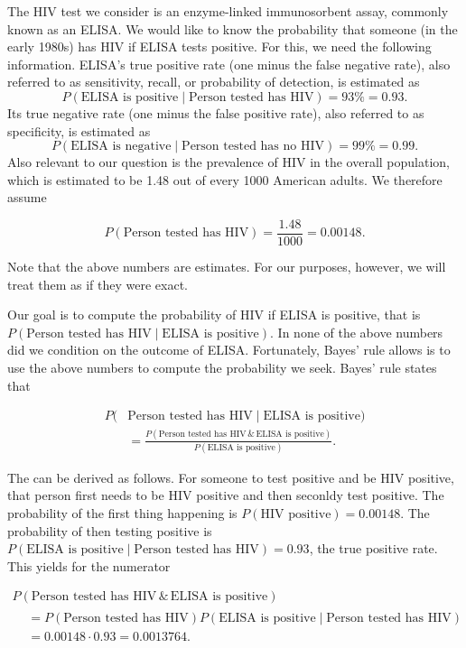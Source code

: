 \documentclass[]{book}
\theoremstyle{definition}
\theoremstyle{definition}
\theoremstyle{definition}
\theoremstyle{remark}
\begin{document}
The HIV test we consider is an enzyme-linked immunosorbent assay,
commonly known as an ELISA. We would like to know the probability that
someone (in the early 1980s) has HIV if ELISA tests positive. For this,
we need the following information. ELISA's true positive rate (one minus
the false negative rate), also referred to as sensitivity, recall, or
probability of detection, is estimated as \[
  P(\text{ELISA is positive} \mid \text{Person tested has HIV}) = 93\% = 0.93.
\] Its true negative rate (one minus the false positive rate), also
referred to as specificity, is estimated as \[
  P(\text{ELISA is negative} \mid \text{Person tested has no HIV}) = 99\% = 0.99.
\] Also relevant to our question is the prevalence of HIV in the overall
population, which is estimated to be 1.48 out of every 1000 American
adults. We therefore assume

\begin{equation}
  P(\text{Person tested has HIV}) = \frac{1.48}{1000} = 0.00148.
  \label{eq:HIVpositive}
\end{equation}

Note that the above numbers are estimates. For our purposes, however, we
will treat them as if they were exact.

Our goal is to compute the probability of HIV if ELISA is positive, that
is \(P(\text{Person tested has HIV} \mid \text{ELISA is positive})\). In
none of the above numbers did we condition on the outcome of ELISA.
Fortunately, Bayes' rule allows is to use the above numbers to compute
the probability we seek. Bayes' rule states that

\[
  \begin{aligned}
  P(&\text{Person tested has HIV}  \mid \text{ELISA is positive}) \\
   & = \frac{P(\text{Person tested has HIV} \,\&\, \text{ELISA is positive})}{P(\text{ELISA is positive})}.
\end{aligned}  
\label{eq:HIVconditional}
\]

The can be derived as follows. For someone to test positive and be HIV
positive, that person first needs to be HIV positive and then seconldy
test positive. The probability of the first thing happening is
\(P(\text{HIV positive}) = 0.00148\). The probability of then testing
positive is
\(P(\text{ELISA is positive} \mid \text{Person tested has HIV}) = 0.93\),
the true positive rate. This yields for the numerator

\begin{multline}
  P(\text{Person tested has HIV} \,\&\, \text{ELISA is positive}) \\
  \begin{split}
  &= P(\text{Person tested has HIV}) P(\text{ELISA is positive} \mid \text{Person tested has HIV}) \\
  &= 0.00148 \cdot 0.93
  = 0.0013764.
  \end{split}
  \label{eq:HIVjoint}
\end{multline}
\end{document}
